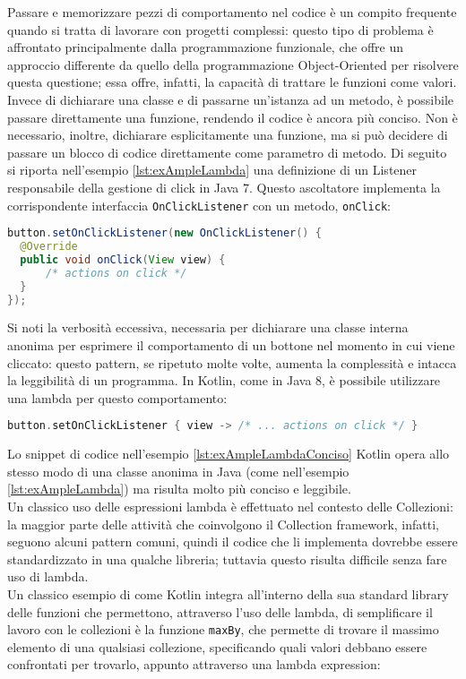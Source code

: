 Passare e memorizzare pezzi di comportamento nel codice è un compito frequente quando si tratta di lavorare con progetti complessi: questo tipo di problema è affrontato principalmente dalla programmazione funzionale, che offre un approccio differente da quello della programmazione Object-Oriented per risolvere questa questione; essa offre, infatti, la capacità di trattare le funzioni come valori. Invece di dichiarare una classe e di passarne un'istanza ad un metodo, è possibile passare direttamente una funzione, rendendo il codice è ancora più conciso. Non è necessario, inoltre, dichiarare esplicitamente una funzione, ma si può decidere di passare un blocco di codice direttamente come parametro di metodo. Di seguito si riporta nell'esempio \ref{lst:exAmpleLambda} una definizione di un Listener responsabile della gestione di click in Java 7. Questo ascoltatore implementa la corrispondente interfaccia \texttt{OnClickListener} con un metodo, \texttt{onClick}:\\

\begin{lstlisting}[caption={Definizione di \texttt{OnClickListener} in Java}, captionpos=b, label={lst:exAmpleLambda}, language=Java]
button.setOnClickListener(new OnClickListener() {
  @Override
  public void onClick(View view) {
      /* actions on click */
  }
});
\end{lstlisting}

Si noti la verbosità eccessiva, necessaria per dichiarare una classe interna anonima per esprimere il comportamento di un bottone nel momento in cui viene cliccato: questo pattern, se ripetuto molte volte, aumenta la complessità e intacca la leggibilità di un programma. In Kotlin, come in Java 8, è possibile utilizzare una lambda per questo comportamento:\\

\begin{lstlisting}[caption={Definizione di una lambda in Kotlin}, captionpos=b, label={lst:exAmpleLambdaConciso}, language=Kotlin]
button.setOnClickListener { view -> /* ... actions on click */ }
\end{lstlisting}

Lo snippet di codice nell'esempio \ref{lst:exAmpleLambdaConciso} Kotlin opera allo stesso modo di una classe anonima in Java (come nell'esempio \ref{lst:exAmpleLambda}) ma risulta molto più conciso e leggibile.\\
Un classico uso delle espressioni lambda è effettuato nel contesto delle Collezioni: la maggior parte delle attività che coinvolgono il Collection framework, infatti, seguono alcuni pattern comuni, quindi il codice che li implementa dovrebbe essere standardizzato in una qualche libreria; tuttavia questo risulta difficile senza fare uso di lambda.\\
Un classico esempio di come Kotlin integra all'interno della sua standard library delle funzioni che permettono, attraverso l'uso delle lambda, di semplificare il lavoro con le collezioni è la funzione \texttt{maxBy}, che permette di trovare il massimo elemento di una qualsiasi collezione, specificando quali valori debbano essere confrontati per trovarlo, appunto attraverso una lambda expression:\\

